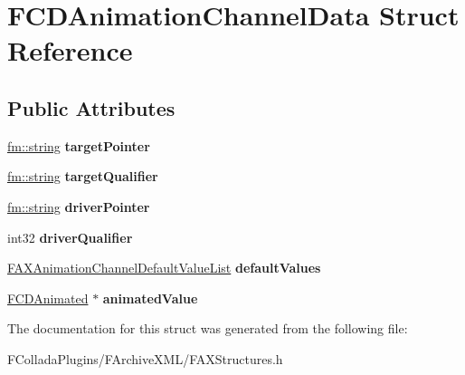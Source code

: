 \hypertarget{structFCDAnimationChannelData}{
\section{FCDAnimationChannelData Struct Reference}
\label{structFCDAnimationChannelData}
}
\subsection*{Public Attributes}
\begin{DoxyCompactItemize}
\item 
\hypertarget{structFCDAnimationChannelData_ae58db047200461748e49df364fa99d4c}{
\hyperlink{classfm_1_1stringT}{fm::string} {\bfseries targetPointer}}
\label{structFCDAnimationChannelData_ae58db047200461748e49df364fa99d4c}

\item 
\hypertarget{structFCDAnimationChannelData_ac42bc46310e5107e40170c5d93157f17}{
\hyperlink{classfm_1_1stringT}{fm::string} {\bfseries targetQualifier}}
\label{structFCDAnimationChannelData_ac42bc46310e5107e40170c5d93157f17}

\item 
\hypertarget{structFCDAnimationChannelData_a05a48028de22e39af19697153c0e737d}{
\hyperlink{classfm_1_1stringT}{fm::string} {\bfseries driverPointer}}
\label{structFCDAnimationChannelData_a05a48028de22e39af19697153c0e737d}

\item 
\hypertarget{structFCDAnimationChannelData_aa19b04f8ef49296a457e28bca417010f}{
int32 {\bfseries driverQualifier}}
\label{structFCDAnimationChannelData_aa19b04f8ef49296a457e28bca417010f}

\item 
\hypertarget{structFCDAnimationChannelData_a6ab55632a777916da6e719ed42a0ce6e}{
\hyperlink{classfm_1_1vector}{FAXAnimationChannelDefaultValueList} {\bfseries defaultValues}}
\label{structFCDAnimationChannelData_a6ab55632a777916da6e719ed42a0ce6e}

\item 
\hypertarget{structFCDAnimationChannelData_a5f314c0134e767f51ac635fc5849a5df}{
\hyperlink{classFCDAnimated}{FCDAnimated} $\ast$ {\bfseries animatedValue}}
\label{structFCDAnimationChannelData_a5f314c0134e767f51ac635fc5849a5df}

\end{DoxyCompactItemize}


The documentation for this struct was generated from the following file:\begin{DoxyCompactItemize}
\item 
FColladaPlugins/FArchiveXML/FAXStructures.h\end{DoxyCompactItemize}
